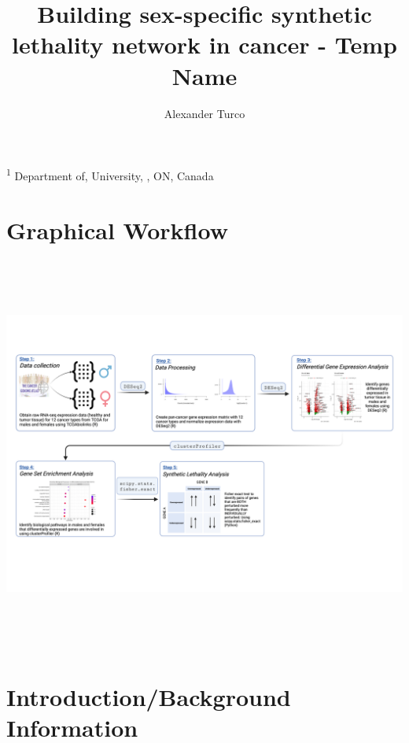 \documentclass[10pt]{article}
\title{\sc Building sex-specific synthetic lethality network in cancer - Temp Name}
\author{\sc Alexander Turco}
\begin{document}

\onecolumn
                        \maketitle

\thispagestyle{empty}
\noindent \textsuperscript{1} Department of, University, , ON, Canada

\newpage
\tableofcontents %
\newpage
       
\section{Graphical Workflow} 

\begin{center}
	\includegraphics[width=\textwidth, height=13cm]{project_workflow_slpmcrc.png}
\end{center}

\newpage
\section{Introduction/Background Information}
\end{document}
